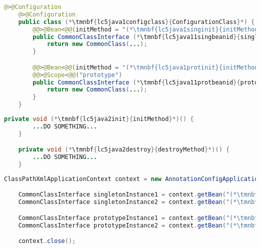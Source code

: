 \begin{lstlisting}[language=Java, title={Configuration class}]@>@Configuration
    @>@Configuration
    public class (*\tmnbf{lc5java1configclass}{ConfigurationClass}*) {
        @@>@Bean<@@(initMethod = "(*\tmnbf{lc5java1singinit}{initMethod}[ForestGreen]*)", destroyMethod = "(*\tmnbf{lc5java1singdestroy}{destroyMethod}[ForestGreen]*)")
        public CommonClassInterface (*\tmnbf{lc5java11singbeanid}{singletonBeanMethod}*)() {
            return new CommonClass(...);
        }

        @@>@Bean<@@(initMethod = "(*\tmnbf{lc5java1protinit}{initMethod}[ForestGreen]*)", destroyMethod = "(*\tmnbf{lc5java1protdestroy}{destroyMethod}[ForestGreen]*)")
        @@>@Scope<@@("prototype")
        public CommonClassInterface (*\tmnbf{lc5java11protbeanid}{prototypeBeanMethod}*)() {
            return new CommonClass(...);
        }
    }
\end{lstlisting}
\begin{lstlisting}[language=Java, title={Snippet of a common bean class}]
    private void (*\tmnbf{lc5java2init}{initMethod}*)() {
        ...DO SOMETHING...
    }

    private void (*\tmnbf{lc5java2destroy}{destroyMethod}*)() {
        ...DO SOMETHING...
    }
\end{lstlisting}
\begin{lstlisting}[language=Java, title={Usage}]
    ClassPathXmlApplicationContext context = new AnnotationConfigApplicationContext((*\tmnbf{lc5java3configclass}{ConfigurationClass}*).class);

    CommonClassInterface singletonInstance1 = context.getBean("(*\tmnbf{lc5java3singbeanid1}{singletonBeanMethod}[ForestGreen]*)", CommonClassInterface.class);
    CommonClassInterface singletonInstance2 = context.getBean("(*\tmnbf{lc5java3singbeanid2}{singletonBeanMethod}[ForestGreen]*)", CommonClassInterface.class);

    CommonClassInterface prototypeInstance1 = context.getBean("(*\tmnbf{lc5java3protbeanid1}{prototypeBeanMethod}[ForestGreen]*)", CommonClassInterface.class);
    CommonClassInterface prototypeInstance2 = context.getBean("(*\tmnbf{lc5java3protbeanid2}{prototypeBeanMethod}[ForestGreen]*)", CommonClassInterface.class);

    context.close();
\end{lstlisting}
